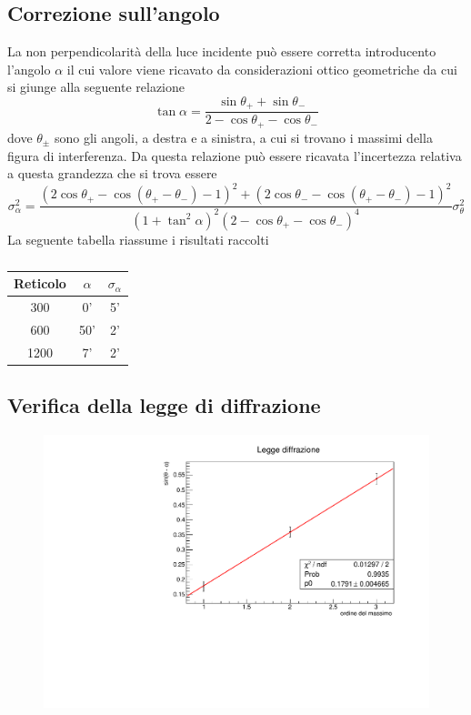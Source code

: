 \subsection{Correzione sull'angolo}
La non perpendicolarità della luce incidente può essere corretta introducento l'angolo $\alpha$ il cui valore viene ricavato da considerazioni ottico geometriche da cui si giunge alla seguente relazione
\begin{equation}
    \tan\alpha=\dfrac{\sin\theta_{+}+\sin\theta_{-}}{2-\cos\theta_{+}-\cos\theta_{-}}
\end{equation}
dove $\theta_\pm$ sono gli angoli, a destra e a sinistra, a cui si trovano i massimi della figura di interferenza. Da questa relazione può essere ricavata l'incertezza relativa a questa grandezza che si trova essere
\begin{equation}
\sigma_{\alpha}^{2}=\frac{\left(2 \cos \theta_{+}-\cos \left(\theta_{+}-\theta_{-}\right)-1\right)^{2}+\left(2 \cos \theta_{-}-\cos \left(\theta_{+}-\theta_{-}\right)-1\right)^{2}}{\left(1+\tan ^{2} \alpha\right)^{2}\left(2-\cos \theta_{+}-\cos \theta_{-}\right)^{4}} \sigma_{\theta}^{2}
\end{equation}
La seguente tabella riassume i risultati raccolti
\begin{table}[h!]
    \centering
    \begin{tabular}{ccc}
    \toprule
    Reticolo & $\alpha$ & $\sigma_\alpha$\\
    \midrule
    300     &0' &5' \\
    \midrule
    600     &50' &2'\\
    \midrule
    1200 & 7' & 2' \\
    \bottomrule
    
    \end{tabular}
    \caption{}
    \label{tab:my_label}
\end{table}
\subsection{Verifica della legge di diffrazione \label{paragrafo 3}}
\begin{figure}[h!]
    \centering
    \includegraphics[scale=.6]{Immagini/legge diffrazione.pdf}
    \caption{}
    \label{fit rifrazione}
\end{figure}

